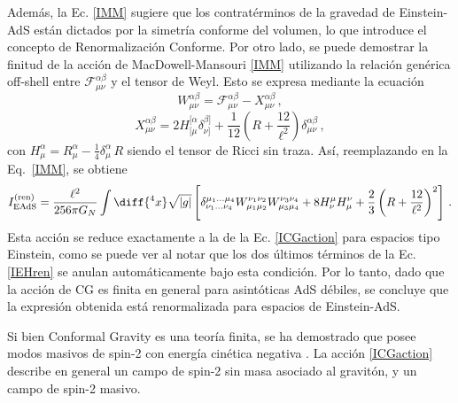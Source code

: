 \documentclass[../Main.tex]{subfiles}
\begin{document}
Además, la Ec. \eqref{IMM} sugiere que los contratérminos de la gravedad de Einstein-AdS están dictados por la simetría conforme del volumen, lo que introduce el concepto de Renormalización Conforme. Por otro lado, se puede demostrar la finitud de la acción de MacDowell-Mansouri \eqref{IMM} utilizando la relación genérica off-shell entre $\mathcal{F}^{\alpha \beta}_{\mu \nu}$ y el tensor de Weyl. Esto se expresa mediante la ecuación
\begin{equation}
W^{\alpha \beta}_{\mu \nu} = \mathcal{F}^{\alpha \beta}_{\mu \nu}- X^{\alpha \beta}_{\mu \nu} \,,
\label{weylfdecomposition}
\end{equation}
\begin{equation}\label{Xtensor}
X^{\alpha \beta}_{\mu \nu} = 2 H^{[\alpha}_{[\mu} \delta^{\beta]}_{\nu]}+ \frac{1}{12} \left(R+\frac{12}{\ell^2} \right) \delta^{\alpha \beta}_{\mu \nu} \,,
\end{equation}
con $H^{\alpha}_{\mu}=R^\alpha_\mu - \tfrac{1}{4}\delta^\alpha_\mu\,R $ siendo el tensor de Ricci sin traza. Así, reemplazando en la Eq.~\eqref{IMM}, se obtiene
\begin{equation}\label{IEHren}
I^{\rm (ren)}_{\rm EAdS} = \frac{\ell^2}{256 \pi G_{N}} \int\diff{^4x}\sqrt{|g|} \left[\delta^{\mu_1\ldots\mu_4}_{\nu_1\ldots\nu_4}W^{\nu_1\nu_2}_{\mu_1\mu_2} W^{\nu_3\nu_4}_{\mu_3\mu_4}+ 8 H^{\mu}_{\nu}H^{\nu}_{\mu}+\frac{2}{3} \left(R+\frac{12}{\ell^2}\right)^{2}\right] \,.
\end{equation}
Esta acción se reduce exactamente a la de la Ec. \eqref{ICGaction} para espacios tipo Einstein, como se puede ver al notar que los dos últimos términos de la Ec. \eqref{IEHren} se anulan automáticamente bajo esta condición. Por lo tanto, dado que la acción de CG es finita en general para asintóticas AdS débiles, se concluye que la expresión obtenida está renormalizada para espacios de Einstein-AdS.


Si bien Conformal Gravity es una teoría finita, se ha demostrado que posee modos masivos de spin-2 con energía cinética negativa \cite{Lu:2011zk}. La acción \eqref{ICGaction} describe en general un campo de spin-2 sin masa asociado al gravitón, y un campo de spin-2 masivo. 
\end{document}
